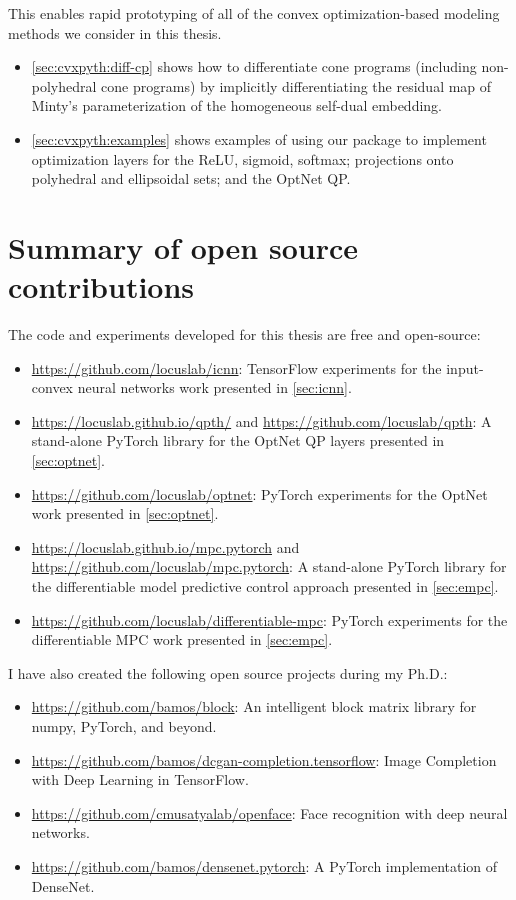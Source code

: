 \begin{itemize}
  This enables rapid prototyping of all of the convex
  optimization-based modeling methods we consider in this thesis.
  \begin{itemize}
  \item \cref{sec:cvxpyth:diff-cp} shows how to differentiate
    cone programs (including non-polyhedral cone programs)
    by implicitly differentiating the residual map of
    Minty's parameterization of the homogeneous
    self-dual embedding.
  \item \cref{sec:cvxpyth:examples} shows examples of using our
    package to implement optimization layers for
    the ReLU, sigmoid, softmax; projections onto polyhedral
    and ellipsoidal sets; and the OptNet QP.
  \end{itemize}
\end{itemize}

\newpage
\section{Summary of open source contributions}
The code and experiments developed for this thesis
are free and open-source:

\begin{itemize}
\item \url{https://github.com/locuslab/icnn}:
  TensorFlow experiments for the input-convex neural networks
  work presented in \cref{sec:icnn}.
\item \url{https://locuslab.github.io/qpth/} and
  \url{https://github.com/locuslab/qpth}:
  A stand-alone PyTorch library for the OptNet QP layers presented
  in \cref{sec:optnet}.
\item \url{https://github.com/locuslab/optnet}:
  PyTorch experiments for the OptNet work
  presented in \cref{sec:optnet}.
\item \url{https://locuslab.github.io/mpc.pytorch}
  and \url{https://github.com/locuslab/mpc.pytorch}:
  A stand-alone PyTorch library for the differentiable
  model predictive control approach presented in
  \cref{sec:empc}.
\item \url{https://github.com/locuslab/differentiable-mpc}:
  PyTorch experiments for the differentiable MPC work
  presented in \cref{sec:empc}.
\end{itemize}

\vspace{5mm}
\noindent
I have also created the following open source
projects during my Ph.D.:
\begin{itemize}
\item \url{https://github.com/bamos/block}:
  An intelligent block matrix library for numpy, PyTorch, and beyond.
\item \url{https://github.com/bamos/dcgan-completion.tensorflow}:
  Image Completion with Deep Learning in TensorFlow.
\item \url{https://github.com/cmusatyalab/openface}:
  Face recognition with deep neural networks.
\item \url{https://github.com/bamos/densenet.pytorch}:
  A PyTorch implementation of DenseNet.
\end{itemize}

